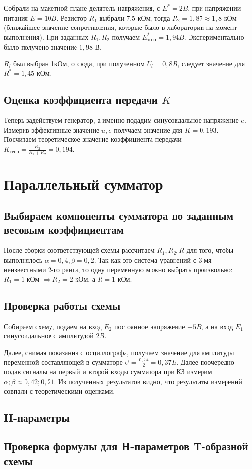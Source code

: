 \documentclass[a4paper, 12pt]{article}%
\begin{document}
Собрали на макетной плане делитель напряжения, с $E^{*} = 2 B$, при напряжении питания $E = 10 B$. Резистор $R_1$ выбрали $7.5 $ кОм, тогда $R_2 = 1,87 \approx 1,8$ кОм (ближайшее значение сопротивления, которые было в лаборатории на момент выполнения). При заданных $R_1, R_2$ получаем $E^{*}_{\text{теор}} = 1,94 B$. Экспериментально было получено значение $1,98$ В.

$R_l$ был выбран 1кОм, отсюда, при полученном $U_l = 0,8 B$, следует значение для $R^{*} = 1,45$ кОм.					
\subsection{Оценка коэффициента передачи $K$}

Теперь задействуем генератор, а именно подадим синусоидальное напряжение $e$. Измерив эффективные значение $u, e$ получаем значение для $K = 0,193$. Посчитаем теоретическое значение коэффициента передачи $K_{\text{теор}} = \frac{R_2}{R_1 + R_2} = 0,194$. 

\section{Параллельный сумматор}
									
\subsection{Выбираем компоненты сумматора по заданным весовым коэффициентам}

После сборки соответствующей схемы рассчитаем $R_1, R_2, R$ для того, чтобы выполнялось $\alpha = 0,4, \beta = 0,2$. Так как это система уравнений с 3-мя неизвестными 2-го ранга, то одну переменную можно выбрать 
произвольно: $R_1 = 1$ кОм $\Rightarrow R_2 = 2$ кОм, а $R = 1$ кОм. 					
					
\subsection{Проверка работы схемы}

Собираем схему, подаем на вход $E_2$ постоянное напряжение $+5 B$, а на вход $E_1$ синусоидальное с амплитудой $2 B$.

Далее, снимая показания с осциллографа, получаем значение для амплитуды переменной составляющей в сумматоре $U = \frac{0,74}{2} = 0,37 B$. Далее поочередно подав сигналы на первый и второй входы сумматора при КЗ измерим $\alpha; \beta \approx 0,42 ; 0,21$. Из полученных результатов видно, что результаты измерений совпали с теоретическими оценками.

\subsection{H-параметры}

\subsection{Проверка формулы для H-параметров T-образной схемы}


					
\end{document}
